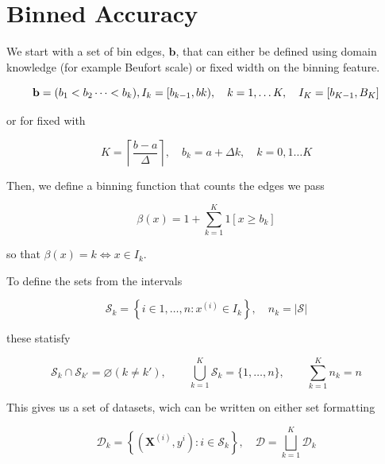 \documentclass{article} %
\begin{document}





\section{Binned Accuracy}
We start with a set of bin edges, \(\mathbf{b}\), that can either be defined using domain knowledge (for example Beufort scale) or fixed width on the binning feature.

\begin{equation}
    \mathbf{b} = (b_1 < b_2 \dots < b_k),\\ I_k = [b_{k-1}, bk),\quad k = 1,\dots K,\quad I_K = [b_{K-1}, B_K]
\end{equation}

or for fixed with

\begin{equation}
    K = \left\lceil \frac{b-a}{\Delta} \right\rceil,\quad b_k = a+\Delta k,\quad k = 0,1\dots K
\end{equation}

Then, we define a binning function that counts the edges we pass

\begin{equation}
    \beta(x) = 1 + \sum_{k=1}^{K}1\left[x \ge b_k\right]
\end{equation}

so that \(\beta(x)=k \Longleftrightarrow  x\in I_k \).

To define the sets from the intervals

\begin{equation}
    \mathcal{S}_k = \left\{ i\in {1,\dots,n} : x^{(i)} \in I_k \right\},\quad
    n_k = \left| \mathcal{S} \right|
\end{equation}

these statisfy

\begin{equation}
    \mathcal{S}_k \cap \mathcal{S}_{k'} = \varnothing (k \neq k'), \qquad
    \bigcup_{k=1}^{K} \mathcal{S}_k = \{1, \dots, n\}, \qquad
    \sum_{k=1}^{K} n_k = n
\end{equation}

This gives us a set of datasets, wich can be written on either set formatting

\begin{equation}
    \mathcal{D}_k = \left\{ \left(\mathbf{X}^(i), y^i \right) : i\in\mathcal{S}_k \right\},\quad
    \mathcal{D} = \bigsqcup^K_{k=1}\mathcal{D}_k
\end{equation}
\end{document}
